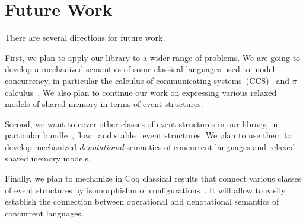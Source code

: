\section{Future Work}

There are several directions for future work. 

First, we plan to apply our library to a wider range of problems. 
We are going to develop a mechanized semantics of some classical 
languages used to model concurrency, in particular 
the calculus of communicating systems~(CCS)~\cite{Milner:80} and 
$\pi$-calculus~\cite{Milner:99}.      
We also plan to continue our work on 
expressing various relaxed models of shared memory 
in terms of event structures.  

Second, we want to cover other classes of event structures in our library, 
in particular bundle~\cite{Langerak:91}, flow~\cite{Boudol-Castellani:1991}
and stable~\cite{Winskel:82, Winskel:86} event structures.
We plan to use them to develop mechanized \emph{denotational} semantics 
of concurrent languages and relaxed shared memory models.  

Finally, we plan to mechanize in Coq classical results 
that connect various classes of event structures  
by isomorphishm of configurations~\cite{Nielsen-al:1981, Boudol-Castellani:1991}. 
It will allow to easily establish the connection between operational and denotational 
semantics of concurrent languages.
